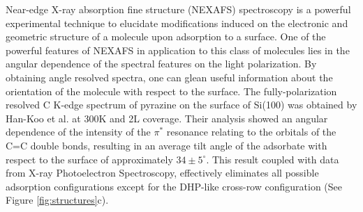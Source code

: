 \documentclass{article}
\begin{document}
Near-edge X-ray absorption fine structure (NEXAFS) spectroscopy is a powerful experimental technique to elucidate modifications induced on the electronic and geometric structure of a molecule upon adsorption to a surface. \cite{stohr_nexafs_1992,penner-hahn_x-ray_1999,garino_determination_2014,tourillon_electronic_1988} One of the powerful features of NEXAFS in application to this class of molecules lies in the angular dependence of the spectral features on the light polarization. By obtaining angle resolved spectra, one can glean useful information about the orientation of the molecule with respect to the surface. \cite{rosenberg_polarization-dependent_1986,shimoyama_evidence_2000,stohr_determination_1987} The fully-polarization resolved C K-edge spectrum of pyrazine on the surface of Si(100) was obtained by Han-Koo et al.\cite{lee_selective_2012}  at 300K and 2L coverage. Their analysis showed an angular dependence of the intensity of the $\pi^*$ resonance relating to the orbitals of the C=C double bonds, resulting in an average tilt angle of the adsorbate with respect to the surface of approximately $34 \pm 5^{\circ}$. This result coupled with data from X-ray Photoelectron Spectroscopy, effectively eliminates all possible adsorption configurations except for the DHP-like cross-row configuration (See Figure \ref{fig:structures}c). 
\end{document}
